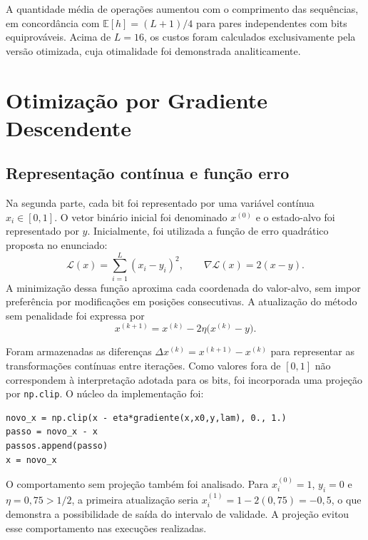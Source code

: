 \documentclass[conference,a4paper]{IEEEtran}
\begin{document}
A quantidade média de operações aumentou com o comprimento das sequências, em concordância com $\mathbb{E}[h]=(L+1)/4$ para pares independentes com bits equiprováveis. Acima de $L=16$, os custos foram calculados exclusivamente pela versão otimizada, cuja otimalidade foi demonstrada analiticamente.

\section{Otimização por Gradiente Descendente}
\subsection{Representação contínua e função erro}
Na segunda parte, cada bit foi representado por uma variável contínua $x_i\in[0,1]$. O vetor binário inicial foi denominado $x^{(0)}$ e o estado-alvo foi representado por $y$. Inicialmente, foi utilizada a função de erro quadrático proposta no enunciado:
\begin{equation}
\mathcal{L}(x)=\sum_{i=1}^L(x_i-y_i)^2,
\qquad \nabla\mathcal{L}(x)=2(x-y).
\end{equation}
A minimização dessa função aproxima cada coordenada do valor-alvo, sem impor preferência por modificações em posições consecutivas. A atualização do método sem penalidade foi expressa por
\begin{equation}
x^{(k+1)}=x^{(k)}-2\eta\bigl(x^{(k)}-y\bigr).
\end{equation}

Foram armazenadas as diferenças $\Delta x^{(k)}=x^{(k+1)}-x^{(k)}$ para representar as transformações contínuas entre iterações. Como valores fora de $[0,1]$ não correspondem à interpretação adotada para os bits, foi incorporada uma projeção por \texttt{np.clip}. O núcleo da implementação foi:
\begin{lstlisting}
novo_x = np.clip(x - eta*gradiente(x,x0,y,lam), 0., 1.)
passo = novo_x - x
passos.append(passo)
x = novo_x
\end{lstlisting}

O comportamento sem projeção também foi analisado. Para $x_i^{(0)}=1$, $y_i=0$ e $\eta=0{,}75>1/2$, a primeira atualização seria $x_i^{(1)}=1-2(0{,}75)=-0{,}5$, o que demonstra a possibilidade de saída do intervalo de validade. A projeção evitou esse comportamento nas execuções realizadas.
\end{document}
